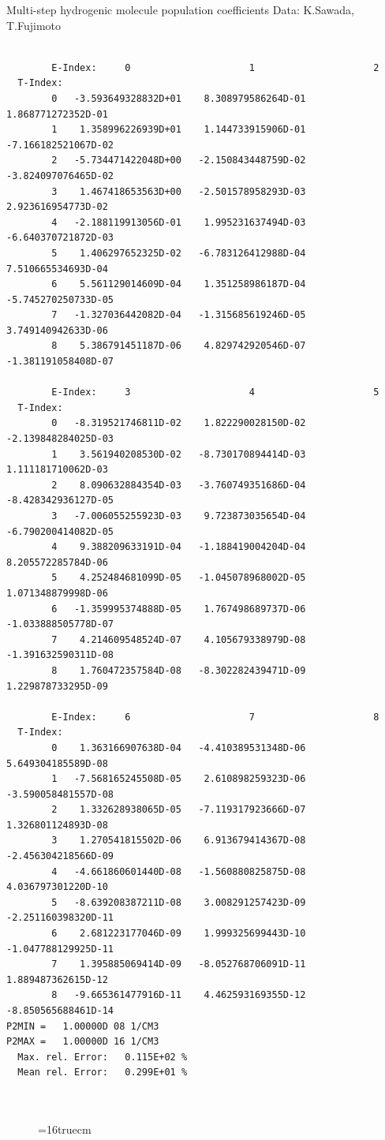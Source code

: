 \documentclass[12pt,dvipdfmx]{article}
\begin{document}
 Multi-step hydrogenic molecule population coefficients
 Data: K.Sawada, T.Fujimoto \cite{kn:Sawada}
\begin{small}\begin{verbatim}

        E-Index:     0                     1                     2
  T-Index:
        0   -3.593649328832D+01    8.308979586264D-01    1.868771272352D-01
        1    1.358996226939D+01    1.144733915906D-01   -7.166182521067D-02
        2   -5.734471422048D+00   -2.150843448759D-02   -3.824097076465D-02
        3    1.467418653563D+00   -2.501578958293D-03    2.923616954773D-02
        4   -2.188119913056D-01    1.995231637494D-03   -6.640370721872D-03
        5    1.406297652325D-02   -6.783126412988D-04    7.510665534693D-04
        6    5.561129014609D-04    1.351258986187D-04   -5.745270250733D-05
        7   -1.327036442082D-04   -1.315685619246D-05    3.749140942633D-06
        8    5.386791451187D-06    4.829742920546D-07   -1.381191058408D-07

        E-Index:     3                     4                     5
  T-Index:
        0   -8.319521746811D-02    1.822290028150D-02   -2.139848284025D-03
        1    3.561940208530D-02   -8.730170894414D-03    1.111181710062D-03
        2    8.090632884354D-03   -3.760749351686D-04   -8.428342936127D-05
        3   -7.006055255923D-03    9.723873035654D-04   -6.790200414082D-05
        4    9.388209633191D-04   -1.188419004204D-04    8.205572285784D-06
        5    4.252484681099D-05   -1.045078968002D-05    1.071348879998D-06
        6   -1.359995374888D-05    1.767498689737D-06   -1.033888505778D-07
        7    4.214609548524D-07    4.105679338979D-08   -1.391632590311D-08
        8    1.760472357584D-08   -8.302282439471D-09    1.229878733295D-09

        E-Index:     6                     7                     8
  T-Index:
        0    1.363166907638D-04   -4.410389531348D-06    5.649304185589D-08
        1   -7.568165245508D-05    2.610898259323D-06   -3.590058481557D-08
        2    1.332628938065D-05   -7.119317923666D-07    1.326801124893D-08
        3    1.270541815502D-06    6.913679414367D-08   -2.456304218566D-09
        4   -4.661860601440D-08   -1.560880825875D-08    4.036797301220D-10
        5   -8.639208387211D-08    3.008291257423D-09   -2.251160398320D-11
        6    2.681223177046D-09    1.999325699443D-10   -1.047788129925D-11
        7    1.395885069414D-09   -8.052768706091D-11    1.889487362615D-12
        8   -9.665361477916D-11    4.462593169355D-12   -8.850565688461D-14
P2MIN =   1.00000D 08 1/CM3
P2MAX =   1.00000D 16 1/CM3
  Max. rel. Error:   0.115E+02 %
  Mean rel. Error:   0.299E+01 %



\end{verbatim}\end{small}
\begin{figure} \label{2.2.5we}
\epsfxsize=16truecm
\end{figure}
\end{document}
